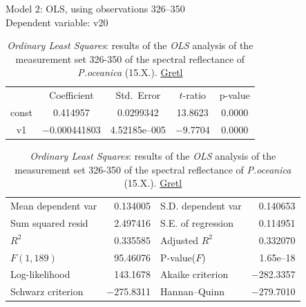 \documentclass[10pt, a4paper]{article}
\begin{document}
\begin{appendices}
\begin{table}[H]
	\begin{center}
		\caption{\textit{Ordinary Least Squares}: results of the \textit{OLS} analysis of the measurement set 326-350 of the spectral reflectance of \textit{P.oceanica} (15.X.). \href{http://gretl.sourceforge.net/}{Gretl}}
		Model 2: OLS, using observations 326--350\\
		Dependent variable: v20 \\

		\vspace{1em}
		\begin{tabular}{c c c c c}
		  & {Coefficient} &  {Std.\ Error} &   {$t$-ratio} &    {p-value} \\[1ex]
		const &  0.414957 &    0.0299342 &      13.8623 &        0.0000 \\
		v1 &   $-$0.000441803 &     4.52185\textrm{e--005} &       $-$9.7704 &         0.0000 \\ \hline\hline
	\end{tabular}
	
	\vspace{2em}
	\begin{tabular}{lrlr}
		Mean dependent var &  0.134005 & S.D. dependent var &  0.140653 \\
		Sum squared resid &  2.497416 & S.E. of regression &  0.114951 \\
		$R^2$ &  0.335585 & Adjusted $R^2$ &  0.332070 \\
		$F(1, 189)$ &  95.46076 & P-value($F$) &  1.65\textrm{e--18} \\
		Log-likelihood &  143.1678 & Akaike criterion & $-$282.3357 \\
		Schwarz criterion & $-$275.8311 & Hannan--Quinn & $-$279.7010 \\
	\end{tabular}
	\label{tab:15}
	\end{center}
\end{table}
\pagebreak


\end{appendices}
\end{document}

